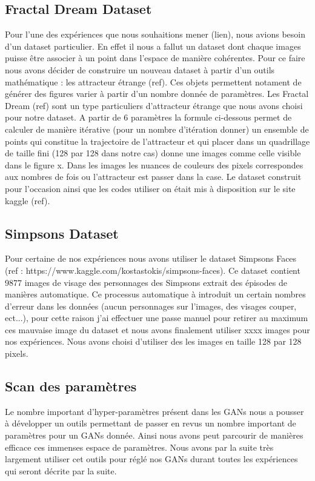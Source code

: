 \documentclass[11pt]{article}
\begin{document}
\subsection{Fractal Dream Dataset}
Pour l'une des expériences que nous souhaitions mener (lien), nous avions besoin d'un dataset particulier.
En effet il nous a fallut un dataset dont chaque images puisse être associer à un point dans l'espace de manière cohérentes.
Pour ce faire nous avons décider de construire un nouveau dataset à partir d'un outils mathématique : les attracteur étrange (ref). Ces objets permettent notament de générer des figures varier à partir d'un nombre donnée de paramètres.
Les Fractal Dream (ref) sont un type particuliers d'attracteur étrange que nous avons choisi pour notre dataset. A partir de 6 paramètres la formule ci-dessous permet de calculer de manière itérative (pour un nombre d'itération donner) un ensemble de points qui constitue la trajectoire de l'attracteur et qui placer dans un quadrillage de taille fini (128 par 128 dans notre cas) donne une images comme celle visible dans le figure x. Dans les images les nuances de couleurs des pixels correspondes aux nombres de fois ou l'attracteur est passer dans la case.
Le dataset construit pour l'occasion ainsi que les codes utiliser on était mis à disposition sur le site kaggle (ref).

\subsection{Simpsons Dataset}
Pour certaine de nos expériences nous avons utiliser le dataset Simpsons Faces (ref : https://www.kaggle.com/kostastokis/simpsons-faces). Ce dataset contient 9877 images de visage des personnages des Simpsons extrait des épisodes de manières automatique. Ce processus  automatique à introduit un certain nombres d'erreur dans les données (aucun personnages sur l'images, des visages couper, ect...), pour cette raison j'ai effectuer une passe manuel pour retirer au maximum ces mauvaise image du dataset et nous avons finalement utiliser xxxx images pour nos expériences.
Nous avons choisi d'utiliser des les images en taille 128 par 128 pixels.

\subsection{Scan des paramètres}
Le nombre important d'hyper-paramètres présent dans les GANs nous a pousser à développer un outils permettant de passer en revus un nombre important de paramètres pour un GANs donnée. Ainsi nous avons peut parcourir de manières efficace ces immenses espace de paramètres.
Nous avons par la suite très largement utiliser cet outils pour réglé nos GANs durant toutes les expériences qui seront décrite par la suite. 
\end{document}
